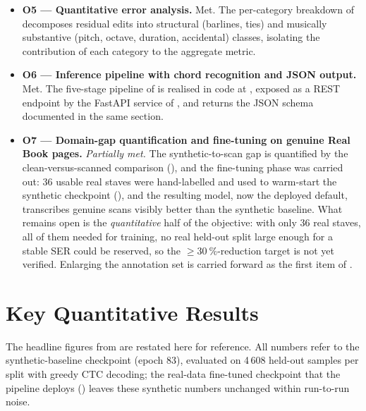 \begin{itemize}
    \item \textbf{O5 — Quantitative error analysis.}
          Met.
          The per-category breakdown of 
          decomposes residual edits into structural (barlines, ties)
          and musically substantive (pitch, octave, duration,
          accidental) classes, isolating the contribution of each
          category to the aggregate metric.
    \item \textbf{O6 — Inference pipeline with chord recognition and JSON
          output.}
          Met.
          The five-stage pipeline of  is
          realised in code at , exposed as a
          REST endpoint by the FastAPI service of
          , and returns the JSON schema documented
          in the same section.
    \item \textbf{O7 — Domain-gap quantification and fine-tuning on
          genuine Real Book pages.}
          \emph{Partially met.}
          The synthetic-to-scan gap is quantified by the
          clean-versus-scanned comparison
          (), and the fine-tuning phase was
          carried out: \num{36} usable real staves were hand-labelled and
          used to warm-start the synthetic checkpoint
          (), and the resulting model, now the
          deployed default, transcribes genuine scans visibly better
          than the synthetic baseline.
          What remains open is the \emph{quantitative} half of the
          objective: with only \num{36} real staves, all of them needed
          for training, no real held-out split large enough for a stable
          SER could be reserved, so the
          $\geq\SI{30}{\percent}$-reduction target is not yet verified.
          Enlarging the annotation set is carried forward as the first
          item of .
\end{itemize}

\section{Key Quantitative Results}
\label{sec:conc-results}

The headline figures from  are restated here for
reference. All numbers refer to the synthetic-baseline checkpoint
(epoch \num{83}), evaluated on 4\,608 held-out samples per split with
greedy CTC decoding; the real-data fine-tuned checkpoint that the
pipeline deploys () leaves these synthetic
numbers unchanged within run-to-run noise.

